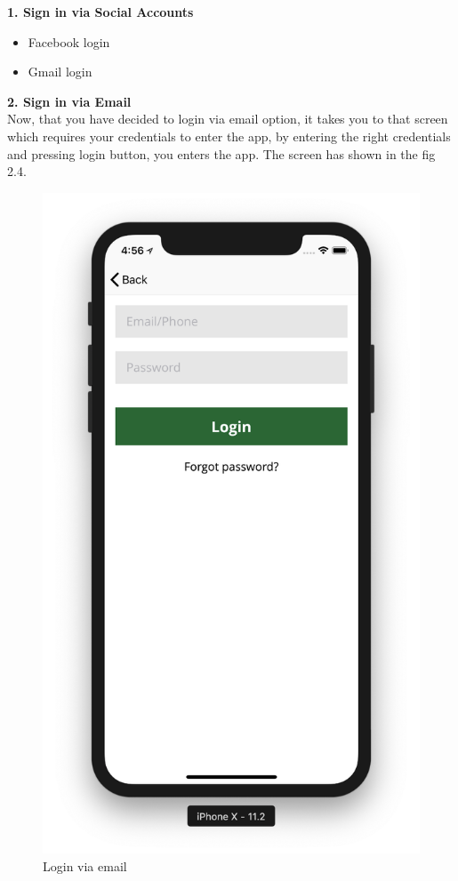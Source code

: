 \begin{itemize}
     \textbf{1. Sign in via Social Accounts}
     
     \begin{itemize}
         \item Facebook login
         \item Gmail login
     \end{itemize}
   
     \textbf{2. Sign in via Email} \\
     
     Now, that you have decided to login via email option, it takes you to that screen which requires your credentials to enter the app, by entering the right credentials and pressing login button, you enters the app. The screen has shown in the fig 2.4.
     
     \begin{figure}[H]
            \centering
            \includegraphics[width=0.5\linewidth]{figures/ch2/login_email.png}
            \caption{\label{fig:main_screen} Login via email}
    \end{figure}
     
\end{itemize}



